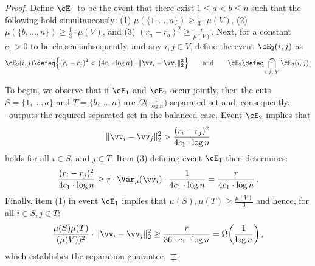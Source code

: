\documentclass[letterpaper]{article}
\begin{document}
\begin{proof}
Define $\cE_1$ to be the event that there exist $1 \leq a < b \leq n$ such that the following hold simultaneously: (1) $\mu(\{ 1, \ldots, a \}) \geq \frac{1}{3} \cdot \mu(V)$, (2) $\mu(\{ b, \ldots, n \}) \geq \frac{1}{3} \cdot \mu(V)$, and (3) $(r_a - r_b)^2 \geq \frac{r}{\mu(V)}$. Next, for a constant $c_1 > 0$ to be chosen subsequently, and any $i, j \in V$, define the event $\cE_{2}(i, j)$ as
\begin{equation*}
\cE_{2}(i, j) \defeq \Big\{ (r_i - r_j)^2 < \big( 4 c_1 \cdot \log n \big) \cdot \lVert \vv_i - \vv_j \rVert_2^2 \Big\}
\qquad\textup{and}\qquad
\cE_2 \defeq \bigcap_{i,j \in V} \cE_{2}(i,j).
\end{equation*}

To begin, we observe that if $\cE_1$ and $\cE_2$ occur jointly, then the cuts $S = \{ 1, \ldots, a \}$ and $T = \{ b, \ldots, n \}$ are $\Omega\big( \frac{1}{\log n} \big)$-separated set  and, consequently, \roundcut~outputs the required separated set in the balanced case.
Event $\cE_2$ implies that
\begin{equation*}
\lVert \vv_i - \vv_j \rVert_2^2
> \frac{(r_i - r_j)^2}{4c_1 \cdot \log n}
\end{equation*}
holds for all $i \in S$, and $j \in T$. Item (3) defining event $\cE_1$ then determines:
\begin{equation*}
\frac{(r_i - r_j)^2}{4c_1 \cdot \log n}
\geq r \cdot \Var_{\mu}(\vv_i) \cdot \frac{1}{4c_1 \cdot \log n}
=  \frac{r}{4c_1 \cdot \log n} \, .
\end{equation*}
Finally, item (1) in event $\cE_1$ implies that $\mu(S), \mu(T) \geq \frac{\mu(V)}{3}$ and hence, for all $i \in S, j \in T$:
\begin{equation*}
\frac{\mu(S) \mu(T)}{(\mu(V))^2} \cdot \lVert \vv_i - \vv_j \rVert_2^2
\geq  \frac{r}{36 \cdot c_1 \cdot \log n} = \Omega\bigg( \frac{1}{\log n} \bigg)\,,
\end{equation*}
which establishes the separation guarantee.


\end{proof}
\end{document}
